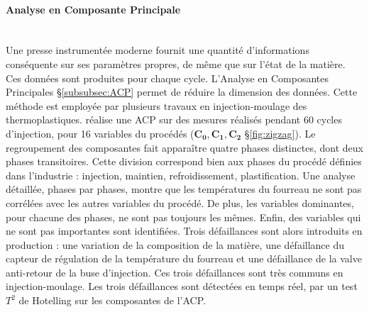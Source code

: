 \paragraph{Analyse en Composante Principale}\mbox{} \\
Une presse instrumentée moderne fournit une quantité d’informations conséquente sur ses paramètres propres, de même que sur l’état de la matière.
Ces données sont produites pour chaque cycle.
L’Analyse en Composantes Principales §\ref{subsubsec:ACP} permet de réduire la dimension des données.
Cette méthode est employée par plusieurs travaux en injection-moulage des thermoplastiques.
\cite{lu_stagebased_2004} réalise une ACP sur des mesures réalisés pendant 60 cycles d'injection, pour 16 variables du procédés ($\boldsymbol{C_0, C_1, C_2}$ §\ref{fig:zigzag}).
Le regroupement des composantes fait apparaître quatre phases distinctes, dont deux phases transitoires.
Cette division correspond bien aux phases du procédé définies dans l'industrie : injection, maintien, refroidissement, plastification.
Une analyse détaillée, phases par phases, montre que les températures du fourreau ne sont pas corrélées avec les autres variables du procédé.
De plus, les variables dominantes, pour chacune des phases, ne sont pas toujours les mêmes.
Enfin, des variables qui ne sont pas importantes sont identifiées.
Trois défaillances sont alors introduits en production : une variation de la composition de la matière, une défaillance du capteur de régulation de la température du fourreau et une défaillance de la valve anti-retour de la buse d’injection.
Ces trois défaillances sont très communs en injection-moulage.
Les trois défaillances sont détectées en temps réel, par un test $T^2$ de  Hotelling \cite{hotelling_analysis_1933} sur les composantes de l'ACP.

